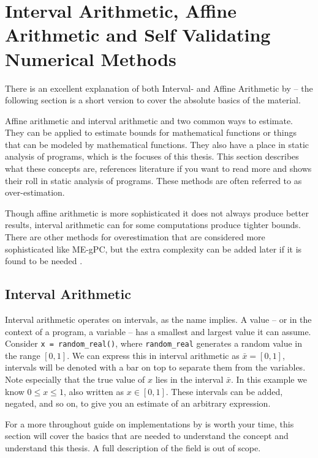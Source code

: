 \documentclass[msc,lith,english]{liuthesis}
\begin{document}
\section{Interval Arithmetic, Affine Arithmetic and Self Validating Numerical Methods}
\label{sec:IAandAA}

There is an excellent explanation of both Interval- and Affine Arithmetic by \citeauthor{src:affAri} -- the following section is a short version to cover the absolute basics of the material.

Affine arithmetic and interval arithmetic and two common ways to estimate. They can be applied to estimate bounds for mathematical functions or things that can be modeled by mathematical functions. They also have a place in static analysis of programs, which is the focuses of this thesis. This section describes what these concepts are, references literature if you want to read more and shows their roll in static analysis of programs. These methods are often referred to as over-estimation.

Though affine arithmetic is more sophisticated it does not always produce better results, interval arithmetic can for some computations produce tighter bounds. There are other methods for overestimation that are considered more sophisticated like ME-gPC, but the extra complexity can be added later if it is found to be needed \cite{src:MEgPC}.

\subsection{Interval Arithmetic}
Interval arithmetic operates on intervals, as the name implies. A value -- or in the context of a program, a variable -- has a smallest and largest value it can assume. Consider \verb`x = random_real()`, where \verb`random_real` generates a random value in the range $[0, 1]$. We can express this in interval arithmetic as $\bar{x} = [0, 1]$, intervals will be denoted with a bar on top to separate them from the variables. Note especially that the true value of $x$ lies in the interval $\bar{x}$. In this example we know $0 \leq x \leq 1$, also written as $x \in [0, 1]$. These intervals can be added, negated, and so on, to give you an estimate of an arbitrary expression.

For a more throughout guide on implementations  by \citeauthor{src:affAir} is worth your time, this section will cover the basics that are needed to understand the concept and understand this thesis. A full description of the field is out of scope.
\end{document}
